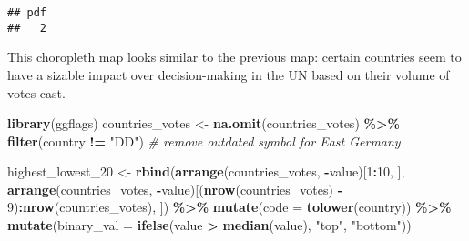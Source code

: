 \documentclass[
]{article}
\newenvironment{Shaded}{\begin{snugshade}}{\end{snugshade}}
\newcommand{\CommentTok}[1]{\textcolor[rgb]{0.56,0.35,0.01}{\textit{#1}}}
\newcommand{\DataTypeTok}[1]{\textcolor[rgb]{0.13,0.29,0.53}{#1}}
\newcommand{\DecValTok}[1]{\textcolor[rgb]{0.00,0.00,0.81}{#1}}
\newcommand{\KeywordTok}[1]{\textcolor[rgb]{0.13,0.29,0.53}{\textbf{#1}}}
\newcommand{\NormalTok}[1]{#1}
\newcommand{\OperatorTok}[1]{\textcolor[rgb]{0.81,0.36,0.00}{\textbf{#1}}}
\newcommand{\StringTok}[1]{\textcolor[rgb]{0.31,0.60,0.02}{#1}}
\begin{document}
\begin{verbatim}
## pdf 
##   2
\end{verbatim}

This choropleth map looks similar to the previous map: certain countries
seem to have a sizable impact over decision-making in the UN based on
their volume of votes cast.

\begin{Shaded}
\begin{Highlighting}[]
\KeywordTok{library}\NormalTok{(ggflags)}
\NormalTok{countries\_votes \textless{}{-}}\StringTok{ }\KeywordTok{na.omit}\NormalTok{(countries\_votes) }\OperatorTok{\%\textgreater{}\%}
\StringTok{  }\KeywordTok{filter}\NormalTok{(country }\OperatorTok{!=}\StringTok{ "DD"}\NormalTok{) }\CommentTok{\# remove outdated symbol for East Germany }

\NormalTok{highest\_lowest\_}\DecValTok{20}\NormalTok{ \textless{}{-}}\StringTok{ }\KeywordTok{rbind}\NormalTok{(}\KeywordTok{arrange}\NormalTok{(countries\_votes, }\OperatorTok{{-}}\NormalTok{value)[}\DecValTok{1}\OperatorTok{:}\DecValTok{10}\NormalTok{, ], }
                \KeywordTok{arrange}\NormalTok{(countries\_votes, }
                        \OperatorTok{{-}}\NormalTok{value)[(}\KeywordTok{nrow}\NormalTok{(countries\_votes) }\OperatorTok{{-}}\StringTok{ }\DecValTok{9}\NormalTok{)}\OperatorTok{:}\KeywordTok{nrow}\NormalTok{(countries\_votes), ]) }\OperatorTok{\%\textgreater{}\%}
\StringTok{  }\KeywordTok{mutate}\NormalTok{(}\DataTypeTok{code =} \KeywordTok{tolower}\NormalTok{(country)) }\OperatorTok{\%\textgreater{}\%}
\StringTok{  }\KeywordTok{mutate}\NormalTok{(}\DataTypeTok{binary\_val =} \KeywordTok{ifelse}\NormalTok{(value }\OperatorTok{\textgreater{}}\StringTok{ }\KeywordTok{median}\NormalTok{(value), }\StringTok{"top"}\NormalTok{, }\StringTok{"bottom"}\NormalTok{))}


\end{Highlighting}
\end{Shaded}
\end{document}
